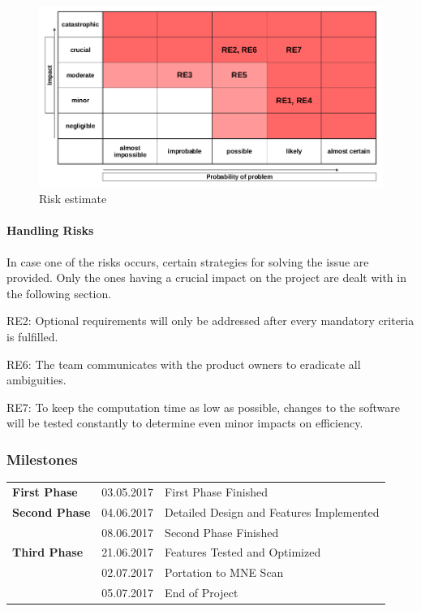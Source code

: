 \begin{figure}[h]
	\begin{center}
		\includegraphics[width= 15cm]{figures/risikoabschaetzung.png}
		\caption{Risk estimate}
	\end{center}
\end{figure}

\paragraph{Handling Risks}

In case one of the risks occurs, certain strategies for solving the issue are provided. Only the ones having a crucial impact on the project are dealt with in the following section. 

\begin{aims}
	
	\item[RE2:]Optional requirements will only be addressed after every mandatory criteria is fulfilled.
	\item[RE6:]The team communicates with the product owners to eradicate all ambiguities.
	\item[RE7:]To keep the computation time as low as possible, changes to the software will be tested constantly to 						   determine even minor impacts on efficiency. 	
	
\end{aims}

\clearpage

\subsubsection{Milestones}

\begin{tabular}{lll}
 	\textbf{First Phase} & 03.05.2017 & First Phase Finished\\
	\textbf{Second Phase} & 04.06.2017 & Detailed Design and Features Implemented\\
				& 08.06.2017 & Second Phase Finished\\
	\textbf{Third Phase} & 21.06.2017 & Features Tested and Optimized\\          
				& 02.07.2017 & Portation to MNE Scan\\
				& 05.07.2017 & End of Project\\
\end{tabular}

